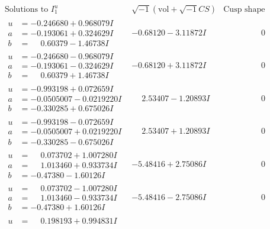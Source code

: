 \documentclass[1p]{elsarticle_modified}
\theoremstyle{definition}
\newcommand{\I}{\sqrt{-1}}
\begin{document}
$$\begin{array}{c|c|c}  
\text{Solutions to }I^u_{1}& \I (\text{vol} + \sqrt{-1}CS) & \text{Cusp shape}\\
 \hline 
\begin{aligned}
u &= -0.246680 + 0.968079 I \\
a &= -0.193061 + 0.324629 I \\
b &= \phantom{-}0.60379 - 1.46738 I\end{aligned}
 & -0.68120 - 3.11872 I & \phantom{-0.000000 } 0 \\ \hline\begin{aligned}
u &= -0.246680 - 0.968079 I \\
a &= -0.193061 - 0.324629 I \\
b &= \phantom{-}0.60379 + 1.46738 I\end{aligned}
 & -0.68120 + 3.11872 I & \phantom{-0.000000 } 0 \\ \hline\begin{aligned}
u &= -0.993198 + 0.072659 I \\
a &= -0.0505007 - 0.0219220 I \\
b &= -0.330285 + 0.675026 I\end{aligned}
 & \phantom{-}2.53407 - 1.20893 I & \phantom{-0.000000 } 0 \\ \hline\begin{aligned}
u &= -0.993198 - 0.072659 I \\
a &= -0.0505007 + 0.0219220 I \\
b &= -0.330285 - 0.675026 I\end{aligned}
 & \phantom{-}2.53407 + 1.20893 I & \phantom{-0.000000 } 0 \\ \hline\begin{aligned}
u &= \phantom{-}0.073702 + 1.007280 I \\
a &= \phantom{-}1.013460 + 0.933734 I \\
b &= -0.47380 - 1.60126 I\end{aligned}
 & -5.48416 + 2.75086 I & \phantom{-0.000000 } 0 \\ \hline\begin{aligned}
u &= \phantom{-}0.073702 - 1.007280 I \\
a &= \phantom{-}1.013460 - 0.933734 I \\
b &= -0.47380 + 1.60126 I\end{aligned}
 & -5.48416 - 2.75086 I & \phantom{-0.000000 } 0 \\ \hline\begin{aligned}
u &= \phantom{-}0.198193 + 0.994831 I \\

\end{aligned}
\end{array}$$
\end{document}
